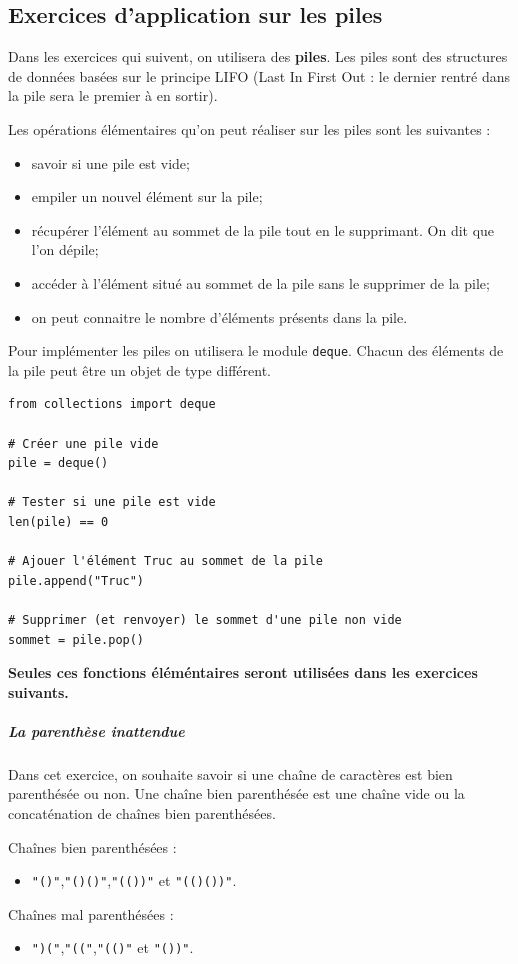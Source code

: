 \subsection*{Exercices d'application sur les piles}


\proffalse

Dans les exercices qui suivent, on utilisera des \textbf{piles}. Les piles sont des structures de données basées sur le principe LIFO (Last In First Out : le dernier rentré dans la pile sera le premier à en sortir).

Les opérations élémentaires qu'on peut réaliser sur les piles sont les suivantes : 
\begin{itemize}
\item savoir si une pile est vide; 
\item empiler un nouvel élément sur la pile;
\item récupérer l'élément au sommet de la pile tout en le supprimant. On dit que l'on dépile;
\item accéder à l'élément situé au sommet de la pile sans le supprimer de la pile;
\item on peut connaitre le nombre d'éléments présents dans la pile.
\end{itemize}

Pour implémenter les piles on utilisera le module \texttt{deque}. Chacun des éléments de la pile peut être un objet de type différent.

\begin{lstlisting} 
from collections import deque

# Créer une pile vide
pile = deque() 

# Tester si une pile est vide
len(pile) == 0

# Ajouer l'élément Truc au sommet de la pile
pile.append("Truc")

# Supprimer (et renvoyer) le sommet d'une pile non vide
sommet = pile.pop()
\end{lstlisting}


\textbf{Seules ces fonctions éléméntaires seront utilisées dans les exercices suivants.}

\subparagraph*{La parenthèse inattendue}
Dans cet exercice, on souhaite savoir si une chaîne de caractères est bien parenthésée ou non. 
Une chaîne bien parenthésée est une chaîne vide ou la concaténation de chaînes bien parenthésées. 
\begin{exemple}
Chaînes bien parenthésées :
\begin{itemize}
\item \texttt{"()"},\texttt{"()()"},\texttt{"(())"} et \texttt{"(()())"}.
\end{itemize}
Chaînes mal parenthésées :
\begin{itemize}
\item \texttt{")("},\texttt{"(("},\texttt{"(()"} et \texttt{"())"}.
\end{itemize}
\end{exemple} 

